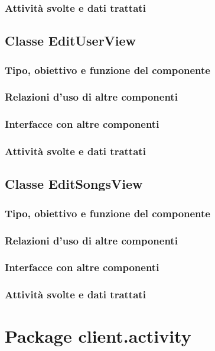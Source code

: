 \subsubsection*{Attivit\`a svolte e dati trattati}

\subsection{Classe EditUserView}
\subsubsection*{Tipo, obiettivo e funzione del componente}
\subsubsection*{Relazioni d'uso di altre componenti}
\subsubsection*{Interfacce con altre componenti}
\subsubsection*{Attivit\`a svolte e dati trattati}

\subsection{Classe EditSongsView}
\subsubsection*{Tipo, obiettivo e funzione del componente}
\subsubsection*{Relazioni d'uso di altre componenti}
\subsubsection*{Interfacce con altre componenti}
\subsubsection*{Attivit\`a svolte e dati trattati}

\newpage
\section{Package client.activity} %
